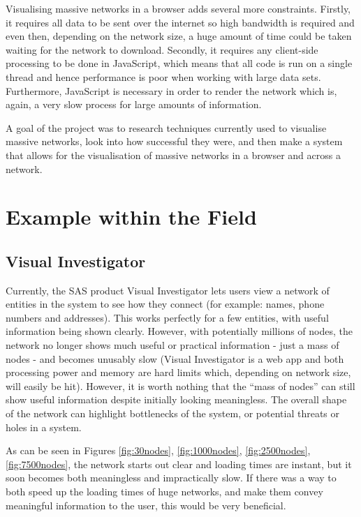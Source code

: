 \documentclass[../dissertation.tex]{subfiles}
\begin{document}
Visualising massive networks in a browser adds several more constraints. Firstly, it requires all data to be sent over the internet so high bandwidth is required and even then, depending on the network size, a huge amount of time could be taken waiting for the network to download. Secondly, it requires any client-side processing to be done in JavaScript, which means that all code is run on a single thread and hence performance is poor when working with large data sets. Furthermore, JavaScript is necessary in order to render the network which is, again, a very slow process for large amounts of information. 

A goal of the project was to research techniques currently used to visualise massive networks, look into how successful they were, and then make a system that allows for the visualisation of massive networks in a browser and across a network. 

\section{Example within the Field}

\subsection{Visual Investigator}
Currently, the SAS product Visual Investigator \cite{sasvi} lets users view a network of entities in the system to see how they connect (for example: names, phone numbers and addresses). This works perfectly for a few entities, with useful information being shown clearly. However, with potentially millions of nodes, the network no longer shows much useful or practical information - just a mass of nodes - and becomes unusably slow (Visual Investigator is a web app and both processing power and memory are hard limits which, depending on network size, will easily be hit). However, it is worth nothing that the ``mass of nodes'' can still show useful information despite initially looking meaningless. The overall shape of the network can highlight bottlenecks of the system, or potential threats or holes in a system.

As can be seen in Figures \ref{fig:30nodes}, \ref{fig:1000nodes}, \ref{fig:2500nodes}, \ref{fig:7500nodes}, the network starts out clear and loading times are instant, but it soon becomes both meaningless and impractically slow. If there was a way to both speed up the loading times of huge networks, and make them convey meaningful information to the user, this would be very beneficial.
\end{document}
